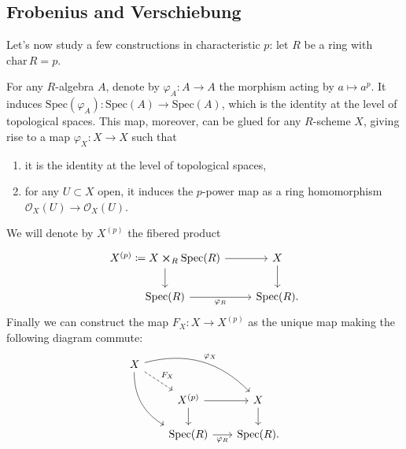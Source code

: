 \subsection{Frobenius and Verschiebung}\label{sec:FrobeniusVerschiebung}
Let's now study a few constructions in characteristic $p$:
let $R$ be a ring with $\mathrm{char}\, R = p$.


\begin{defn}[]
	For any $R$-algebra $A$,
	denote by $\varphi_A\colon A \to A$ the morphism
	acting by $a \mapsto a^p$.
	It induces $\mathrm{Spec}(\varphi_A)\colon \mathrm{Spec}(A) \to \mathrm{Spec}(A)$,
	which is the identity at the level of topological spaces.
	This map, moreover, can be glued for any $R$-scheme $X$, giving rise to a map
	$\varphi_X\colon X \to X$ such that
\begin{enumerate}
	\item it is the identity at the level of topological spaces,
	\item for any $U \subset X$ open, it induces the $p$-power map
		as a ring homomorphism $\mathcal{O}_{X}(U) \to \mathcal{O}_{ X }(U)$.
\end{enumerate}
	We will denote by $X^{(p)}$ the fibered product
	\begin{equation}
	\begin{tikzcd}
		X^{(p)} \coloneqq X \cross_{ R } \mathrm{Spec}(R) \arrow[r, "", rightarrow] 
		\arrow[d, "", rightarrow] &
		X \arrow[d, "", rightarrow] \\
		\mathrm{Spec}(R) \arrow[r, "\varphi_R"', rightarrow] &
		\mathrm{Spec}(R)
	.\end{tikzcd}
	\end{equation}
	Finally we can construct the map $F_X \colon X \to X^{(p)}$ as the unique map
	making the following diagram commute:
	\begin{equation}
	\begin{tikzcd}[row sep=1.6em, column sep=1.8em]
		X \arrow[rrd, "\varphi_X", rightarrow, bend left] 
		\arrow[rdd, "", rightarrow, bend right, end anchor=north west]
		\arrow[rd, "F_X", dashrightarrow] & & \\
		&
		X^{(p)} \arrow[r, "", rightarrow] 
		\arrow[d, "", rightarrow] &
		X \arrow[d, "", rightarrow] \\
		&
		\mathrm{Spec}(R) \arrow[r, "\varphi_R"', rightarrow] &
		\mathrm{Spec}(R)
	.\end{tikzcd}
	\end{equation}
\end{defn}


